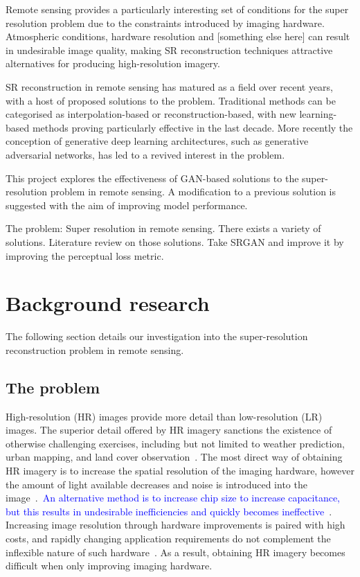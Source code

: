 Remote sensing provides a particularly interesting set of conditions for the super resolution problem due to the constraints introduced by imaging hardware. Atmospheric conditions, hardware resolution and [something else here] can result in undesirable image quality, making SR reconstruction techniques attractive alternatives for producing high-resolution imagery.

SR reconstruction in remote sensing has matured as a field over recent years, with a host of proposed solutions to the problem. Traditional methods can be categorised as interpolation-based or reconstruction-based, with new learning-based methods proving particularly effective in the last decade. More recently the conception of generative deep learning architectures, such as generative adversarial networks, has led to a revived interest in the problem.

This project explores the effectiveness of GAN-based solutions to the super-resolution problem in remote sensing. A modification to a previous solution is suggested with the aim of improving model performance.

The problem: Super resolution in remote sensing. There exists a variety of solutions. Literature review on those solutions. Take SRGAN and improve it by improving the perceptual loss metric.

\clearpage
\section{Background research}\label{sec:background_research}
The following section details our investigation into the super-resolution reconstruction problem in remote sensing.

\subsection{The problem}\label{subsec:the_problem}
High-resolution (HR) images provide more detail than low-resolution (LR) images. The superior detail offered by HR imagery sanctions the existence of otherwise challenging exercises, including but not limited to weather prediction, urban mapping, and land cover observation~\cite{urbanMapping, mapping, cloudCover, vegetationMapping}. The most direct way of obtaining HR imagery is to increase the spatial resolution of the imaging hardware, however the amount of light available decreases and noise is introduced into the image~\cite{superResOverview}.\ \textcolor{blue}{An alternative method is to increase chip size to increase capacitance, but this results in undesirable inefficiencies and quickly becomes ineffective~\cite{superResOverview}}. Increasing image resolution through hardware improvements is paired with high costs, and rapidly changing application requirements do not complement the inflexible nature of such hardware~\cite{ref}. As a result, obtaining HR imagery becomes difficult when only improving imaging hardware.

